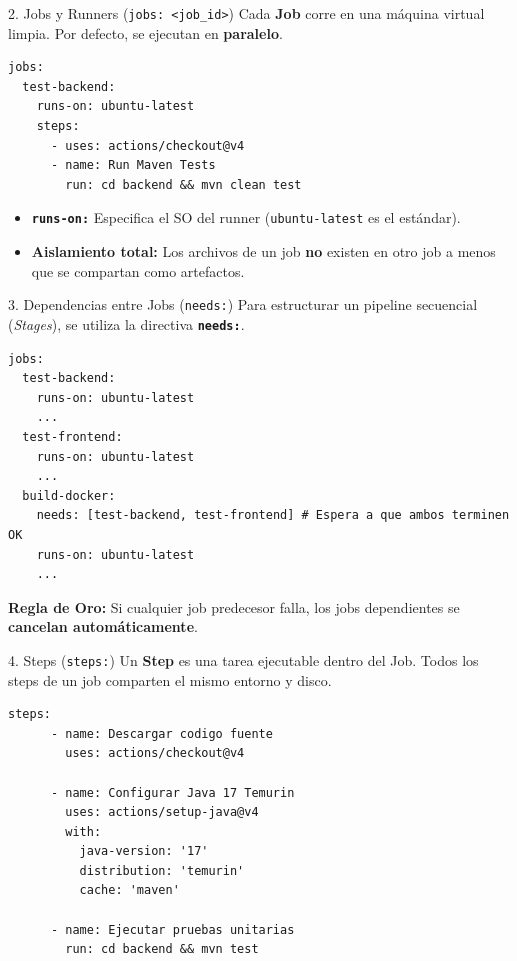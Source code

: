 \documentclass[aspectratio=169]{beamer}
\begin{document}
\begin{frame}[fragile]{2. Jobs y Runners (\texttt{jobs: <job\_id>})}
  \vspace{0.1cm}
  Cada \textbf{Job} corre en una máquina virtual limpia. Por defecto, se ejecutan en \textbf{paralelo}.
  \vspace{0.15cm}
  \begin{lstlisting}[style=yamllst]
jobs:
  test-backend:
    runs-on: ubuntu-latest
    steps:
      - uses: actions/checkout@v4
      - name: Run Maven Tests
        run: cd backend && mvn clean test
  \end{lstlisting}
  \vspace{0.1cm}
  \begin{itemize}
    \item \textbf{\texttt{runs-on:}} Especifica el SO del runner (\texttt{ubuntu-latest} es el estándar).
    \item \textbf{Aislamiento total:} Los archivos de un job \textbf{no} existen en otro job a menos que se compartan como artefactos.
  \end{itemize}
\end{frame}

\begin{frame}[fragile]{3. Dependencias entre Jobs (\texttt{needs:})}
  \vspace{0.1cm}
  Para estructurar un pipeline secuencial (\textit{Stages}), se utiliza la directiva \textbf{\texttt{needs:}}.
  \vspace{0.15cm}
  \begin{lstlisting}[style=yamllst]
jobs:
  test-backend:
    runs-on: ubuntu-latest
    ...
  test-frontend:
    runs-on: ubuntu-latest
    ...
  build-docker:
    needs: [test-backend, test-frontend] # Espera a que ambos terminen OK
    runs-on: ubuntu-latest
    ...
  \end{lstlisting}
  \vspace{0.1cm}
  \textbf{Regla de Oro:} Si cualquier job predecesor falla, los jobs dependientes se \textbf{cancelan automáticamente}.
\end{frame}

\begin{frame}[fragile]{4. Steps (\texttt{steps:})}
  \vspace{0.1cm}
  Un \textbf{Step} es una tarea ejecutable dentro del Job. Todos los steps de un job comparten el mismo entorno y disco.
  \vspace{0.15cm}
  \begin{lstlisting}[style=yamllst]
    steps:
      - name: Descargar codigo fuente
        uses: actions/checkout@v4

      - name: Configurar Java 17 Temurin
        uses: actions/setup-java@v4
        with:
          java-version: '17'
          distribution: 'temurin'
          cache: 'maven'

      - name: Ejecutar pruebas unitarias
        run: cd backend && mvn test
  \end{lstlisting}
\end{frame}
\end{document}
